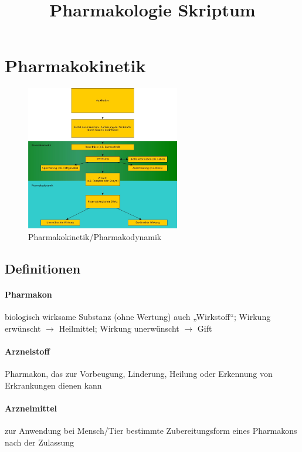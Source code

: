 \documentclass[10pt,a4paper]{report}
\title{Pharmakologie Skriptum}
\begin{document}
\maketitle
\tableofcontents

\chapter{Pharmakokinetik} 
\begin{figure}
	\centering 
		\includegraphics[width=0.6\textwidth]{Bilder/Pharmakokinetik.jpg} 
		\caption{Pharmakokinetik/Pharmakodynamik} 
	\label{fig:Pharmakokinetik}
\end{figure}

\section{Definitionen}
\subsubsection{Pharmakon} 
biologisch wirksame Substanz (ohne Wertung) auch „Wirkstoff“; Wirkung erwünscht $\rightarrow$ Heilmittel; Wirkung unerwünscht  $\rightarrow$ Gift

\subsubsection{Arzneistoff} 
Pharmakon, das zur Vorbeugung, Linderung, Heilung oder Erkennung von Erkrankungen dienen kann

\subsubsection{Arzneimittel} zur Anwendung bei Mensch/Tier bestimmte Zubereitungsform eines Pharmakons nach der Zulassung
\end{document}
